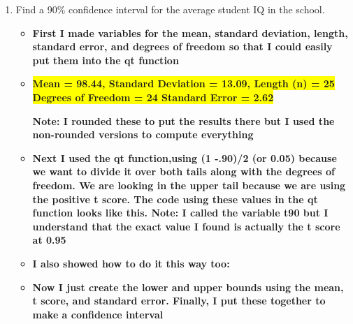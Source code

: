 \documentclass[12pt,letterpaper]{article}
\begin{document}
\begin{enumerate}
	\item Find a 90\% confidence interval for the average student IQ in the school.\\
	
\noindent
		\begin{itemize}
			\item \textbf{First I made variables for the mean, standard deviation, length, standard error, and degrees of freedom so that I could easily put them into the qt function}
			
			
				 
					 
						  
			
			
			\item \textbf{\colorbox{yellow}{Mean = 98.44, Standard Deviation = 13.09, Length (n) = 25}} \newline \textbf{ \colorbox{yellow} {Degrees of Freedom = 24 Standard Error = 2.62}}
			
			 \subitem \textbf {Note: I rounded these to put the results there but I used the non-rounded versions to compute everything}
			 
			\item \textbf{Next I used the qt function,using (1 -.90)/2 (or 0.05) because we want to divide it over both tails along with the degrees of freedom. We are looking in the upper tail because we are using the positive t score.  The code using these values in the qt function looks like this. Note: I called the variable t90 but I understand that the exact value I found is actually the t score at 0.95}
			
			
			
			\item \textbf{I also showed how to do it this way too:}
			
			
			
			\item \textbf{Now I just create the lower and upper bounds using the mean, t score, and standard error. Finally, I put these together to make a confidence interval}
			
			
			

\end{itemize}
\end{enumerate}
\end{document}

